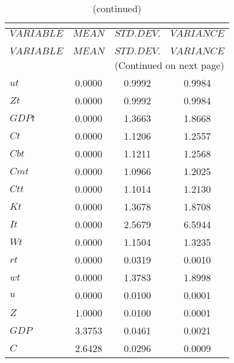  
\begin{center}
\begin{longtable}{lccc} 
\caption{THEORETICAL MOMENTS}\\
 \label{Table:th_moments}\\
\toprule 
$VARIABLE  $	 & 	 $         MEAN$	 & 	 $    STD. DEV.$	 & 	 $     VARIANCE$\\
\midrule \endfirsthead 
\caption{(continued)}\\
 \toprule \\ 
$VARIABLE  $	 & 	 $         MEAN$	 & 	 $    STD. DEV.$	 & 	 $     VARIANCE$\\
\midrule \endhead 
\midrule \multicolumn{4}{r}{(Continued on next page)} \\ \bottomrule \endfoot 
\bottomrule \endlastfoot 
$ut        $	 & 	       0.0000	 & 	       0.9992	 & 	       0.9984 \\ 
$Zt        $	 & 	       0.0000	 & 	       0.9992	 & 	       0.9984 \\ 
$GDPt      $	 & 	       0.0000	 & 	       1.3663	 & 	       1.8668 \\ 
$Ct        $	 & 	       0.0000	 & 	       1.1206	 & 	       1.2557 \\ 
$Cbt       $	 & 	       0.0000	 & 	       1.1211	 & 	       1.2568 \\ 
$Cmt       $	 & 	       0.0000	 & 	       1.0966	 & 	       1.2025 \\ 
$Ctt       $	 & 	       0.0000	 & 	       1.1014	 & 	       1.2130 \\ 
$Kt        $	 & 	       0.0000	 & 	       1.3678	 & 	       1.8708 \\ 
$It        $	 & 	       0.0000	 & 	       2.5679	 & 	       6.5944 \\ 
$Wt        $	 & 	       0.0000	 & 	       1.1504	 & 	       1.3235 \\ 
$rt        $	 & 	       0.0000	 & 	       0.0319	 & 	       0.0010 \\ 
$wt        $	 & 	       0.0000	 & 	       1.3783	 & 	       1.8998 \\ 
$u         $	 & 	       0.0000	 & 	       0.0100	 & 	       0.0001 \\ 
$Z         $	 & 	       1.0000	 & 	       0.0100	 & 	       0.0001 \\ 
$GDP       $	 & 	       3.3753	 & 	       0.0461	 & 	       0.0021 \\ 
$C         $	 & 	       2.6428	 & 	       0.0296	 & 	       0.0009 \\ 

\end{longtable}
\end{center}
